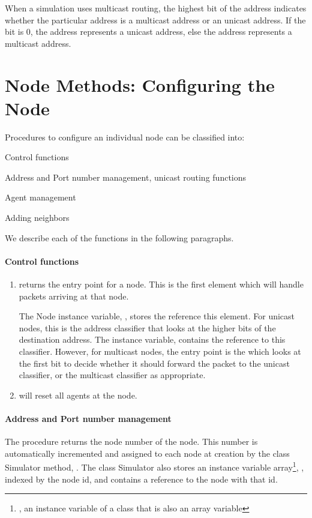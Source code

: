 When a simulation uses multicast routing,
the highest bit of the address indicates whether the particular
address is a multicast address or an unicast address.
If the bit is 0, the address represents a unicast address,
else the address represents a multicast address.

\section{Node Methods: Configuring the Node}
\label{sec:node:node}

Procedures to configure an individual node can be classified into:
\begin{list}{---}{\itemsep0pt}
\item Control functions
\item Address and Port number management, unicast routing functions
\item Agent management
\item Adding neighbors
\end{list}
We describe each of the functions in the following paragraphs.

\paragraph{Control functions}
\begin{enumerate}
\item {} %
returns the entry point for a node.
This is the first element which will handle packets arriving at that node.

The Node instance variable, , stores the reference this element.
For unicast nodes, this is the address classifier that looks at the higher
bits of the destination address.
The instance variable,  contains the reference to this
classifier.
However, for multicast nodes, the entry point is the
 which looks at the first bit to decide whether
it should forward the packet to the unicast classifier, or the multicast
classifier as appropriate.

\item {} %
will reset all agents at the node.
\end{enumerate}


\paragraph{Address and Port number management}
The procedure  %
returns the node number of the node.
This number is automatically incremented and assigned to each node at
creation by the class Simulator method, .%
The class Simulator also stores an instance variable array\footnote{%
  \ie, an instance variable of a class that is also an array variable},
  , indexed by the node id, and contains a reference to the
  node with that id.

